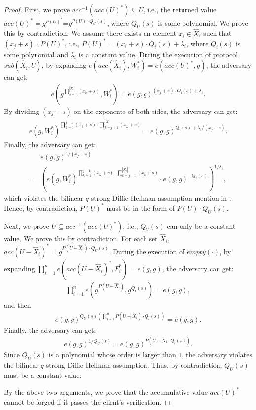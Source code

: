 \begin{proof}
  First, we prove $acc^{-1}({acc(U)}^*)\subseteq U$, i.e., the returned value ${acc(U)}^*=g^{{P(U)}^*}$=$g^{P(U) \cdot Q_U(s)}$, where $Q_U(s)$ is some polynomial. We prove this by contradiction.
  We assume there exists an element $x_j \in \widehat{X}_i$ such that $(x_j + s) \nmid {P(U)}^*$, i.e., ${P(U)}^* = (x_i + s) \cdot Q_i(s) + \lambda_i$, where $Q_i(s)$ is some polynomial and $\lambda_i$ is a constant value. During the execution of protocol $sub(\widehat{X}_i, U)$, by expanding $e(acc(\widehat{X}_i), W_i^*) = e({acc(U)}^*, g)$, the adversary can get:
  \begin{align*}
    e(g^{\prod_{k=1}^{|\widehat{X}_i|}(x_k+s) }, W_i^*)  = {e(g, g)}^{(x_j+s) \cdot Q_i(s) + \lambda_i}.
  \end{align*}
  By dividing $(x_j+s)$ on the exponents of both sides, the adversary can get:
  \begin{align*}
    {e(g, W_i^*)}^{\prod_{k=1}^{j-1}{(x_k+s)} \cdot \prod_{k=j+1}^{|\widehat{X}_i|}{(x_k+s)}} = {e (g, g)}^{Q_i(s) + \lambda_i/(x_j+s)}.
  \end{align*}
  Finally, the adversary can get:
  \begin{align}
&{e(g, g)}^{1/(x_j + s)}  \nonumber \\
    = &{({e(g, W_i^*)}^{\prod_{k=1}^{j-1}(x_k+s) \cdot \prod_{k=j+1}^{|\widehat{X}_i|}{(x_k+s)}} \cdot {e(g, g)}^{-Q_i(s)})}^{1/\lambda_i},\nonumber
  \end{align}
  which violates the bilinear $q$-strong Diffie-Hellman assumption mention in . Hence, by contradiction, ${P(U)}^*$ must be in the form of $P(U) \cdot Q_U(s)$.

  Next, we prove $U \subseteq acc^{-1}({acc(U)}^*)$, i.e., $Q_U(s)$ can only be a constant value. We prove this by contradiction. For each set $\widehat{X}_i$, ${acc(U - \widehat{X}_i)}^* = g^{P(U-\widehat{X}_i) \cdot Q_U(s)}$. During the execution of $empty(\cdot)$, by expanding $\prod_{i=1}^n e({acc(U-\widehat{X}_i)}^*, F_i^*)=e(g, g)$, the adversary can get:
  \begin{align*}
    \prod_{i=1}^n e(g^{P(U-\widehat{X}_i)}, g^{Q_i(s)}) = e(g, g),
  \end{align*}
  and then
  \begin{align*}
    {e(g,g)}^{Q_U(s)(\prod_{i=1}^n P(U-\widehat{X}_i)\cdot Q_i(s))}=e(g,g).
  \end{align*}
  Finally, the adversary can get:
  \begin{align*}
    {e(g, g)}^{1/Q_U(s)} = {e(g, g)}^{P(U-\widehat{X}_i \cdot Q_i(s))}.
  \end{align*}
  Since $Q_U(s)$ is a polynomial whose order is larger than $1$, the adversary violates the bilinear $q$-strong Diffie-Hellman assumption. Thus, by contradiction, $Q_U(s)$ must be a constant value.

  By the above two arguments, we prove that the accumulative value ${acc(U)}^*$ cannot be forged if it passes the client's verification.
\end{proof}

